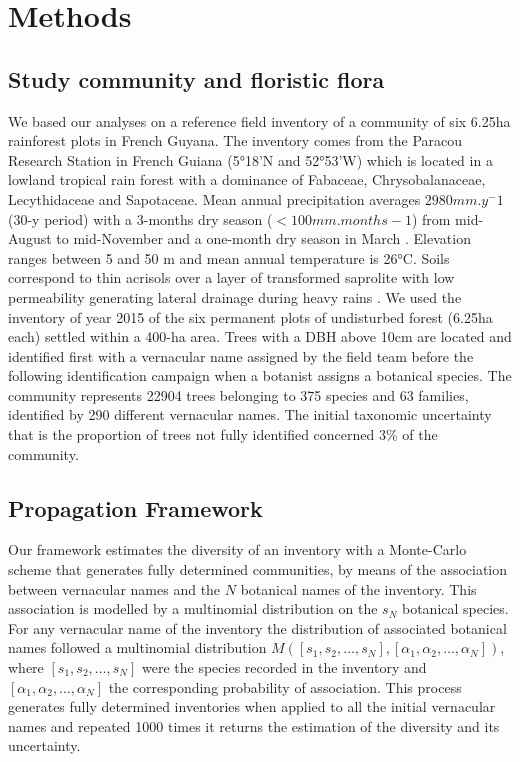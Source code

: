 \documentclass[fleqn,10pt]{ArtEcoFoG} %
\begin{document}
\section{Methods}\label{methods}

\subsection{Study community and floristic
flora}\label{study-community-and-floristic-flora}

We based our analyses on a reference field inventory of a community of
six 6.25ha rainforest plots in French Guyana. The inventory comes from
the Paracou Research Station in French Guiana (5°18'N and 52°53'W) which
is located in a lowland tropical rain forest with a dominance of
Fabaceae, Chrysobalanaceae, Lecythidaceae and Sapotaceae. Mean annual
precipitation averages \(2980 mm.y^-1\) (30-y period) with a 3-months
dry season (\(< 100 mm.months-1\)) from mid-August to mid-November and a
one-month dry season in March \citep{Wagner2011}. Elevation ranges
between 5 and 50 m and mean annual temperature is 26°C. Soils correspond
to thin acrisols over a layer of transformed saprolite with low
permeability generating lateral drainage during heavy rains
\citep{IUSSWorkingGroupWRB2015}. We used the inventory of year 2015 of
the six permanent plots of undisturbed forest (6.25ha each) settled
within a 400-ha area. Trees with a DBH above 10cm are located and
identified first with a vernacular name assigned by the field team
before the following identification campaign when a botanist assigns a
botanical species. The community represents 22904 trees belonging to 375
species and 63 families, identified by 290 different vernacular names.
The initial taxonomic uncertainty that is the proportion of trees not
fully identified concerned 3\% of the community.

\subsection{Propagation Framework}\label{propagation-framework}

Our framework estimates the diversity of an inventory with a Monte-Carlo
scheme that generates fully determined communities, by means of the
association between vernacular names and the \(N\) botanical names of
the inventory. This association is modelled by a multinomial
distribution on the \(s_N\) botanical species. For any vernacular name
of the inventory the distribution of associated botanical names followed
a multinomial distribution
\(M([s_1, s_2, …, s_N] ,[\alpha_1, \alpha_2,…, \alpha_N])\), where
\([s_1, s_2, …, s_N]\) were the species recorded in the inventory and
\([\alpha_1, \alpha_2,…, \alpha_N]\) the corresponding probability of
association. This process generates fully determined inventories when
applied to all the initial vernacular names and repeated 1000 times it
returns the estimation of the diversity and its uncertainty.
\end{document}
